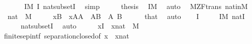 \begin{isabellebody}
\ \ \ \ \isamarkupfalse%
\ \ {\isacartoucheopen}I{\isasymin}M{\isacartoucheclose}\ {\isacartoucheopen}{}{\isasymin}I{\isacartoucheclose}\ nat{\isacharunderscore}{\kern0pt}subset{\isacharunderscore}{\kern0pt}I{\isacharprime}{\kern0pt}\ \isamarkupfalse%
\ simp\isanewline
\ \ \isamarkupfalse%
\ \isamarkupfalse%
\ {\isacharquery}{\kern0pt}thesis\ \isamarkupfalse%
\ {\isacartoucheopen}I{\isasymin}M{\isacartoucheclose}\ \isamarkupfalse%
\ auto\isanewline
{}\isamarkupfalse%
%
\endisatagproof
{\isafoldproof}%
%
\isadelimproof
\isanewline
%
\endisadelimproof
\isanewline
{}\isamarkupfalse%
\ {\isacharparenleft}{\kern0pt}\ M{\isacharunderscore}{\kern0pt}ZF{\isacharunderscore}{\kern0pt}trans{\isacharparenright}{\kern0pt}\ nat{\isacharunderscore}{\kern0pt}in{\isacharunderscore}{\kern0pt}M\ {\isacharcolon}{\kern0pt}\isanewline
\ \ {\isachardoublequoteopen}nat\ {\isasymin}\ M{\isachardoublequoteclose}\isanewline
%
\isadelimproof
%
\endisadelimproof
%
\isatagproof
{}\isamarkupfalse%
\ {\isacharminus}{\kern0pt}\isanewline
\ \ \isamarkupfalse%
\ {}{\isacharcolon}{\kern0pt}{\isachardoublequoteopen}{\isacharbraceleft}{\kern0pt}x{\isasymin}B\ {\isachardot}{\kern0pt}\ x{\isasymin}A{\isacharbraceright}{\kern0pt}{\isacharequal}{\kern0pt}A{\isachardoublequoteclose}\ \ {\isachardoublequoteopen}A{\isasymsubseteq}B{\isachardoublequoteclose}\ \ A\ B\isanewline
\ \ \ \ \isamarkupfalse%
\ that\ \isamarkupfalse%
\ auto\isanewline
\ \ \isamarkupfalse%
\ I\ \isanewline
\ \ \ \ {\isachardoublequoteopen}I{\isasymin}M{\isachardoublequoteclose}\ {\isachardoublequoteopen}nat{\isasymsubseteq}I{\isachardoublequoteclose}\isanewline
\ \ \ \ \isamarkupfalse%
\ nat{\isacharunderscore}{\kern0pt}subset{\isacharunderscore}{\kern0pt}I\ \isamarkupfalse%
\ auto\isanewline
\ \ \isamarkupfalse%
\ \isamarkupfalse%
\ {\isachardoublequoteopen}{\isacharbraceleft}{\kern0pt}x{\isasymin}I\ {\isachardot}{\kern0pt}\ x{\isasymin}nat{\isacharbraceright}{\kern0pt}\ {\isasymin}\ M{\isachardoublequoteclose}\isanewline
\ \ \ \ \isamarkupfalse%
\ finite{\isacharunderscore}{\kern0pt}sep{\isacharunderscore}{\kern0pt}intf\ separation{\isacharunderscore}{\kern0pt}closed{\isacharbrackleft}{\kern0pt}of\ {\isachardoublequoteopen}{\isasymlambda}x\ {\isachardot}{\kern0pt}\ x{\isasymin}nat{\isachardoublequoteclose}{\isacharbrackright}{\kern0pt}\ \isamarkupfalse%

\end{isabellebody}
